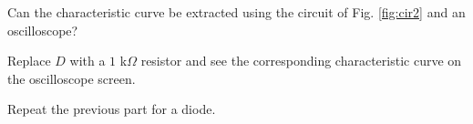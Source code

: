 \documentclass[11pt]{article}
\begin{document}
\begin{question}
    \begin{subquestion}{Can the characteristic curve be extracted using the circuit of Fig. \ref{fig:cir2} and an oscilloscope? }
        \answer{}
    \end{subquestion}

    \begin{subquestion}{Replace $D$ with a $1$ k$\Omega$ resistor and see the corresponding characteristic curve on the oscilloscope screen.}
        \answer{}
    \end{subquestion}

    \begin{subquestion}{Repeat the previous part for a diode.}
        \answer{}
    \end{subquestion}


\end{question}

\end{document}

